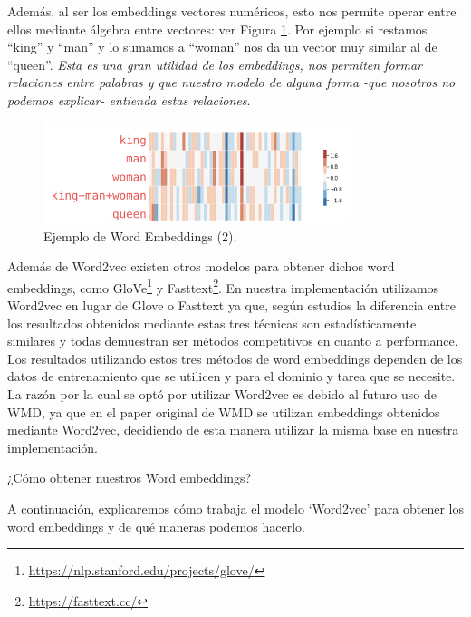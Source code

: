 \documentclass[12pt,a4paper]{article}
\makeatletter
\renewcommand\paragraph{\@startsection{paragraph}{4}{\z@}
            {-2.5ex\@plus -1ex \@minus -.25ex}
            {1.25ex \@plus .25ex}
            {\normalfont\normalsize\bfseries}}
\makeatother
\begin{document}
\begin{sloppypar}
Además, al ser los embeddings vectores numéricos, esto nos permite operar entre ellos mediante álgebra entre vectores: ver Figura \ref{fig:Imagen_NLP_14}. Por ejemplo si restamos “king” y “man” y lo sumamos a “woman” nos da un vector muy similar al de “queen”. \textit{Esta es una gran utilidad de los embeddings, nos permiten formar relaciones entre palabras y que nuestro modelo de alguna forma -que nosotros no podemos explicar- entienda estas relaciones}.

\begin{figure}[H]    
 \centering
 \includegraphics[width=0.8\textwidth]{images/NLP/14.png}
 \caption{Ejemplo de Word Embeddings (2)\cite{datitos_nlp}.}
 \label{fig:Imagen_NLP_14}
\end{figure}

Además de Word2vec existen otros modelos para obtener dichos word embeddings, como GloVe\footnote{\url{https://nlp.stanford.edu/projects/glove/}} y Fasttext\footnote{\url{https://fasttext.cc/}}. En nuestra implementación utilizamos Word2vec en lugar de Glove o Fasttext ya que, según estudios\cite{NLP_12, NLP_13} la diferencia entre los resultados obtenidos mediante estas tres técnicas son estadísticamente similares y todas demuestran ser métodos competitivos en cuanto a performance. Los resultados utilizando estos tres métodos de word embeddings dependen de los datos de entrenamiento que se utilicen y para el dominio y tarea que se necesite. La razón por la cual se optó por utilizar Word2vec es debido al futuro uso de WMD, ya que en el paper original de WMD\cite{wmd_paper} se utilizan embeddings obtenidos mediante Word2vec, decidiendo de esta manera utilizar la misma base en nuestra implementación.

\cleardoublepage

\paragraph{¿Cómo obtener nuestros Word embeddings?}\label{obt_word_emb}

A continuación, explicaremos cómo trabaja el modelo ‘Word2vec’ para obtener los word embeddings y de qué maneras podemos hacerlo\cite{NLP_26}.


\end{sloppypar}
\end{document}
